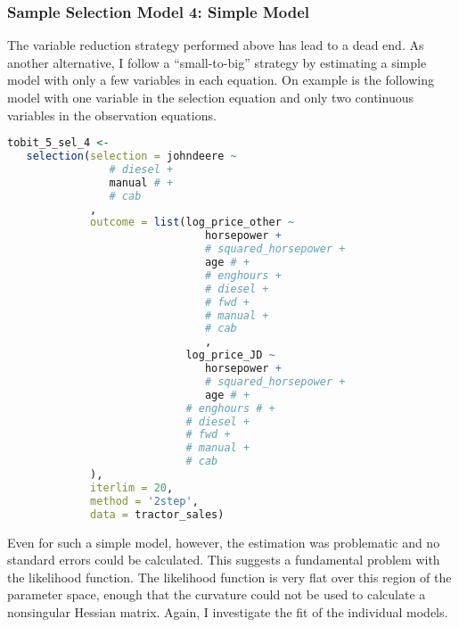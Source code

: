 \subsubsection{Sample Selection Model 4: Simple Model}

The variable reduction strategy performed above has lead to a dead end. 
As another alternative, I follow a ``small-to-big'' strategy
by estimating a simple model with only a few variables in each equation. 
On example is the following model with one variable in the selection equation
and only two continuous variables in the observation equations.

\begin{lstlisting}[language=R]
tobit_5_sel_4 <-
   selection(selection = johndeere ~
                # diesel +
                manual # +
                # cab
             ,
             outcome = list(log_price_other ~
                               horsepower +
                               # squared_horsepower +
                               age # +
                               # enghours +
                               # diesel +
                               # fwd +
                               # manual +
                               # cab
                               ,
                            log_price_JD ~
                               horsepower +
                               # squared_horsepower +
                               age # +
                            # enghours # +
                            # diesel +
                            # fwd +
                            # manual +
                            # cab
             ),
             iterlim = 20,
             method = '2step',
             data = tractor_sales)
\end{lstlisting}

Even for such a simple model, however, 
the estimation was problematic and no standard errors could be calculated. 
This suggests a fundamental problem with the likelihood function. 
The likelihood function is very flat over this region of the parameter space, 
enough that the curvature could not be used to calculate a nonsingular Hessian matrix. 
Again, I investigate the fit of the individual models.

